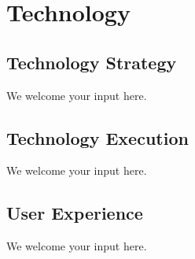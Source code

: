 \part{Technology}\label{pt:ekgmm-c}

\chapter{Technology Strategy}\label{ch:ekgmm-c-1}

We welcome your input here.

\chapter{Technology Execution}\label{ch:ekgmm-c-2}

We welcome your input here.

\chapter{User Experience}\label{ch:ekgmm-c-3}

We welcome your input here.


